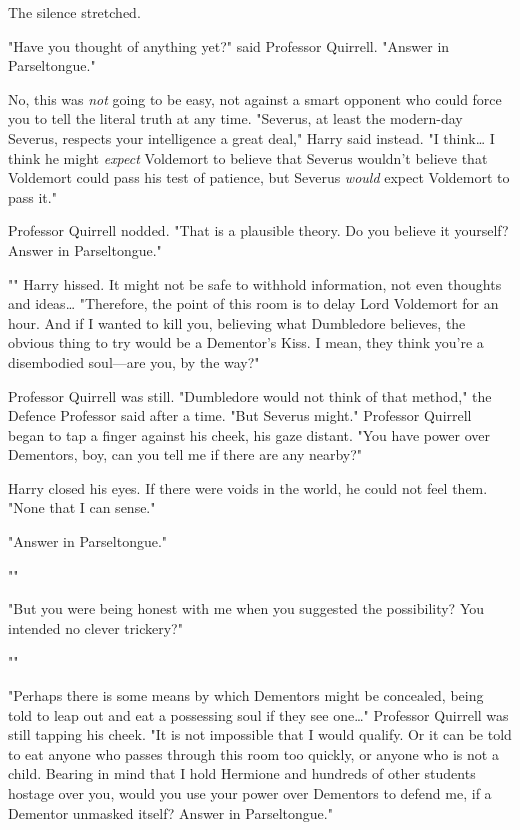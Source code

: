 The silence stretched.

"Have you thought of anything yet?" said Professor Quirrell. "Answer in
Parseltongue."

No, this was \emph{not} going to be easy, not against a smart opponent who
could force you to tell the literal truth at any time. "Severus, at least the
modern-day Severus, respects your intelligence a great deal," Harry said
instead. "I think{\ldots} I think he might \emph{expect} Voldemort to believe
that Severus wouldn't believe that Voldemort could pass his test of patience,
but Severus \emph{would} expect Voldemort to pass it."

Professor Quirrell nodded. "That is a plausible theory. Do you believe it
yourself? Answer in Parseltongue."

"" Harry hissed. It might not be safe to withhold information, not
even thoughts and ideas{\ldots} "Therefore, the point of this room is to delay
Lord Voldemort for an hour. And if I wanted to kill you, believing what
Dumbledore believes, the obvious thing to try would be a Dementor's Kiss. I
mean, they think you're a disembodied soul---are you, by the way?"

Professor Quirrell was still. "Dumbledore would not think of that method," the
Defence Professor said after a time. "But Severus might." Professor Quirrell
began to tap a finger against his cheek, his gaze distant. "You have power over
Dementors, boy, can you tell me if there are any nearby?"

Harry closed his eyes. If there were voids in the world, he could not feel
them. "None that I can sense."

"Answer in Parseltongue."

""

"But you were being honest with me when you suggested the possibility? You
intended no clever trickery?"

""

"Perhaps there is some means by which Dementors might be concealed, being told
to leap out and eat a possessing soul if they see one{\ldots}" Professor
Quirrell was still tapping his cheek. "It is not impossible that I would
qualify. Or it can be told to eat anyone who passes through this room too
quickly, or anyone who is not a child. Bearing in mind that I hold Hermione and
hundreds of other students hostage over you, would you use your power over
Dementors to defend me, if a Dementor unmasked itself? Answer in Parseltongue."

